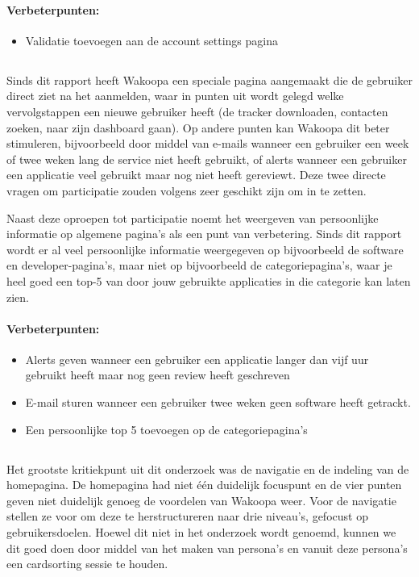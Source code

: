 \documentclass[a4paper, 10pt, pdftex]{report}
\begin{document}
      \paragraph{\textbf{Verbeterpunten:}}
      \begin{itemize}
        \item Validatie toevoegen aan de account settings pagina
      \end{itemize}

    \subsection{\cite{Alfrink2008}}
    Sinds dit rapport heeft Wakoopa een speciale pagina aangemaakt die de gebruiker direct ziet na het aanmelden, waar in punten uit wordt gelegd welke vervolgstappen een nieuwe gebruiker heeft (de tracker downloaden, contacten zoeken, naar zijn dashboard gaan). Op andere punten kan Wakoopa dit beter stimuleren, bijvoorbeeld door middel van e-mails wanneer een gebruiker een week of twee weken lang de service niet heeft gebruikt, of alerts wanneer een gebruiker een applicatie veel gebruikt maar nog niet heeft gereviewt. Deze twee directe vragen om participatie zouden volgens \citeauthor{Alfrink2008} zeer geschikt zijn om in te zetten.

    Naast deze oproepen tot participatie noemt \citeauthor{Alfrink2008} het weergeven van persoonlijke informatie op algemene pagina's als een punt van verbetering. Sinds dit rapport wordt er al veel persoonlijke informatie weergegeven op bijvoorbeeld de software en developer-pagina's, maar niet op bijvoorbeeld de categoriepagina's, waar je heel goed een top-5 van door jouw gebruikte applicaties in die categorie kan laten zien.
    \paragraph{\textbf{Verbeterpunten:}}
      \begin{itemize}
        \item Alerts geven wanneer een gebruiker een applicatie langer dan vijf uur gebruikt heeft maar nog geen review heeft geschreven
        \item E-mail sturen wanneer een gebruiker twee weken geen software heeft getrackt.
        \item Een persoonlijke top 5 toevoegen op de categoriepagina's
      \end{itemize}

    \subsection{\cite{Hoekman2008}}
    Het grootste kritiekpunt uit dit onderzoek was de navigatie en de indeling van de homepagina. De homepagina had niet \'e\'en duidelijk focuspunt en de vier punten geven niet duidelijk genoeg de voordelen van Wakoopa weer. Voor de navigatie stellen ze voor om deze te herstructureren naar drie niveau's, gefocust op gebruikersdoelen. Hoewel dit niet in het onderzoek wordt genoemd, kunnen we dit goed doen door middel van het maken van persona's en vanuit deze persona's een cardsorting sessie te houden.
\end{document}
